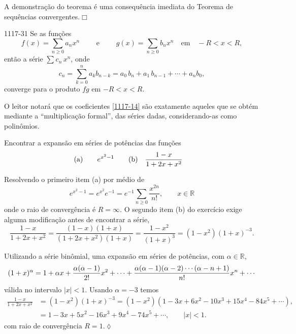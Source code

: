 \prova A demonstração do teorema é uma consequência imediata do
Teorema de sequências convergentes.\hfill $\Box$

\begin{theoc}{}{1117-31} Se as funções
\begin{equation*}
  f(x) =\sum_{n\geq 0}a_nx^n \qquad \text{ e } \qquad g(x)=
  \sum_{n\geq 0}b_nx^n \quad \text{em}\quad - R < x < R,
\end{equation*}
então a série $\sum_{}c_n\,x^{n}$, onde
\begin{equation}\label{1117-14}
c_n =\sum_{k = 0}^{n}a_{k}b_{n-k}=a_{0}\,b_n+a_{1}\,b_{n-1}+\cdots+a_{n}b_{0},
\end{equation}
converge para o produto $fg$ em $- R < x < R$.
\end{theoc}

O leitor notará que os coeficientes \eqref{1117-14} são exatamente
aqueles que se obtém mediante a ``multiplicação formal'', das
séries dadas, considerando-as como polinômios.

\begin{exer}
Encontrar a expansão em séries de potências das funções
\begin{align*}
\rm{(a)}&\quad \quad e^{x^2-1}\quad &\rm{(b)}&\quad \frac{1-x}{1+2x+x^2}
\end{align*}
\end{exer}

\solo Resolvendo o primeiro item (a) por médio de
\begin{equation*}
    e^{x^2-1}=e^{x^2}e^{-1}=e^{-1}\sum_{n\ge
    0}\frac{x^{2n}}{n!},\qquad x\in \mathbb{R}
\end{equation*}
onde o raio de convergência é $R=\infty$. O segundo item (b) do exercício
exige alguma modificação antes de encontrar a série,
\begin{equation*}
\dfrac{1-x}{1+2x+x^2}=\dfrac{(1-x)(1+x)}{(1+2x+x^2)(1+x)}=\dfrac{1-x^2}{(1+x)^3}=
(1-x^2)(1+x)^{-3}.
\end{equation*}

Utilizando a série binômial, uma expansão em séries de potências, com \(\alpha\in \mathbb{R}\),
\begin{equation*}
  (1+x)^{\alpha}=1+\alpha x+\frac{\alpha(\alpha-1)}{2!}x^2+\cdots+\frac{\alpha(\alpha-1)(\alpha-2)\cdots(\alpha-n+1)}{n!}x^n+\cdots
\end{equation*}
válida no intervalo $|x|<1$. Usando \(\alpha=-3\) temos
\begin{align*}
\frac{1-x}{1+2x+x^2}&=(1-x^2)(1+x)^{-3} =(1-x^2)(1-3x+6x^{2}-10x^{3}+15x^{4}-84x^{5}+\cdots),\\[2ex]
&=1-3x+5x^{2}-16x^{3}+9x^{4}-74x^{5}+\cdots, \qquad |x|<1.
\end{align*}
com raio de convergência $R=1$.\hfill \(\lozenge\)

